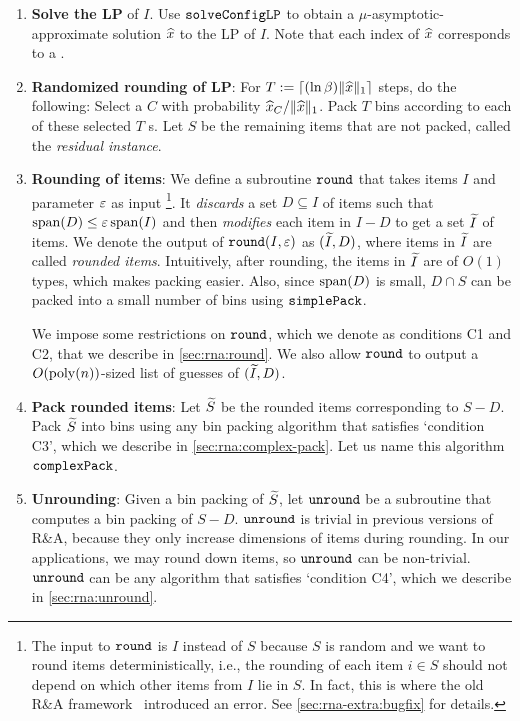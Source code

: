 \begin{enumerate}
\item \textbf{Solve the \Config{} LP} of $I$.
Use $\operatorname{\mathtt{solveConfigLP}}$ to obtain a $\mu$-asymptotic-approximate solution $\widehat{x}$ to the
\config{} LP of $I$. Note that each index of $\widehat{x}$ corresponds to a \config{}.

\item \textbf{Randomized rounding of \config{} LP}:
For $T := \left\lceil (\ln\beta)\lVert \widehat{x} \rVert_1 \right\rceil$ steps, do the following:
Select a \config{} $C$ with probability $\widehat{x}_C/\lVert \widehat{x} \rVert_1$.
Pack $T$ bins according to each of these selected $T$ \config{}s.
Let $S$ be the remaining items that are not packed, called the \emph{residual instance}.

\item \textbf{Rounding of items}:
We define a subroutine $\operatorname{\mathtt{round}}$ that takes items $I$ and parameter $\varepsilon$ as input%
\footnote{The input to $\operatorname{\mathtt{round}}$ is $I$ instead of $S$ because $S$ is random
and we want to round items deterministically, i.e.,
the rounding of each item $i \in S$ should
not depend on which other items from $I$ lie in $S$.
In fact, this is where the old R\&A framework~\cite{khan-thesis} introduced an error.
See \cref{sec:rna-extra:bugfix} for details.}.
It \emph{discards} a set $D \subseteq I$ of items such that $\operatorname{span}(D) \le \varepsilon\operatorname{span}(I)$
and then \emph{modifies} each item in $I-D$ to get a set $\widetilde{I}$ of items.
We denote the output of $\operatorname{\mathtt{round}}(I, \varepsilon)$ as $(\widetilde{I}, D)$, where
items in $\widetilde{I}$ are called \emph{rounded items}.
Intuitively, after rounding, the items in $\widetilde{I}$ are of $O(1)$ types,
which makes packing easier.
Also, since $\operatorname{span}(D)$ is small, $D \cap S$ can be packed
into a small number of bins using $\operatorname{\mathtt{simplePack}}$.

We impose some restrictions on $\operatorname{\mathtt{round}}$, which we denote as conditions C1 and C2,
that we describe in \cref{sec:rna:round}.
We also allow $\operatorname{\mathtt{round}}$ to output a $O(\operatorname{poly}(n))$-sized list of guesses of $(\widetilde{I}, D)$.

\item \textbf{Pack rounded items}:
Let $\widetilde{S}$ be the rounded items corresponding to $S - D$.
Pack $\widetilde{S}$ into bins using any bin packing algorithm that satisfies `condition C3',
which we describe in \cref{sec:rna:complex-pack}.
Let us name this algorithm $\operatorname{\mathtt{complexPack}}$.

\item \textbf{Unrounding}:
Given a bin packing of $\widetilde{S}$, let $\operatorname{\mathtt{unround}}$ be a subroutine that
computes a bin packing of $S - D$.
$\operatorname{\mathtt{unround}}$ is trivial in previous versions of R\&A, because they only increase dimensions
of items during rounding. In our applications, we may round down items,
so $\operatorname{\mathtt{unround}}$ can be non-trivial.
$\operatorname{\mathtt{unround}}$ can be any algorithm that satisfies `condition C4',
which we describe in \cref{sec:rna:unround}.
\end{enumerate}

